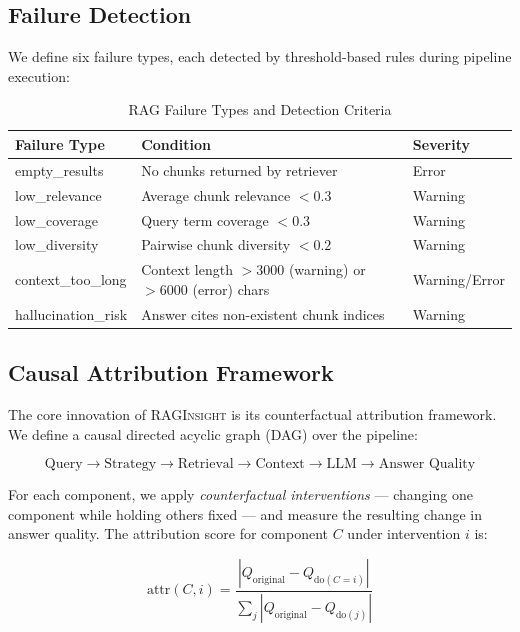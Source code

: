 \documentclass[11pt,a4paper]{article}
\begin{document}
\subsection{Failure Detection}

We define six failure types, each detected by threshold-based rules during pipeline execution:

\begin{table}[h]
\centering
\caption{RAG Failure Types and Detection Criteria}
\label{tab:failure_types}
\begin{tabular}{lp{4cm}p{5cm}}
\toprule
\textbf{Failure Type} & \textbf{Condition} & \textbf{Severity} \\
\midrule
empty\_results & No chunks returned by retriever & Error \\
low\_relevance & Average chunk relevance $< 0.3$ & Warning \\
low\_coverage & Query term coverage $< 0.3$ & Warning \\
low\_diversity & Pairwise chunk diversity $< 0.2$ & Warning \\
context\_too\_long & Context length $> 3000$ (warning) or $> 6000$ (error) chars & Warning/Error \\
hallucination\_risk & Answer cites non-existent chunk indices & Warning \\
\bottomrule
\end{tabular}
\end{table}

\subsection{Causal Attribution Framework}

The core innovation of \textsc{RAGInsight} is its counterfactual attribution framework. We define a causal directed acyclic graph (DAG) over the pipeline:

\[
\text{Query} \rightarrow \text{Strategy} \rightarrow \text{Retrieval} \rightarrow \text{Context} \rightarrow \text{LLM} \rightarrow \text{Answer Quality}
\]

For each component, we apply \textit{counterfactual interventions} — changing one component while holding others fixed — and measure the resulting change in answer quality. The attribution score for component $C$ under intervention $i$ is:

\[
\text{attr}(C, i) = \frac{|Q_{\text{original}} - Q_{\text{do}(C=i)}|}{\sum_j |Q_{\text{original}} - Q_{\text{do}(j)}|}
\]
\end{document}
